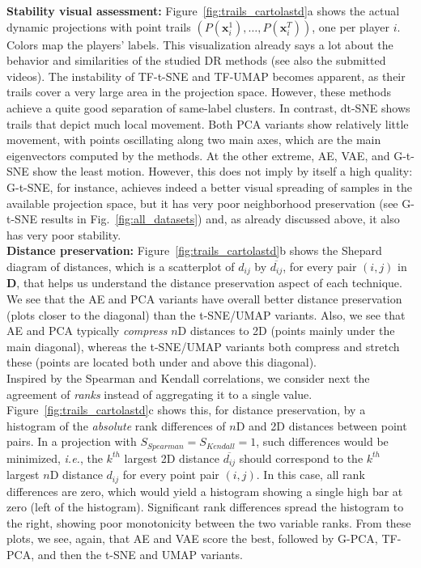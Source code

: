 \noindent\textbf{Stability visual assessment:} Figure~\ref{fig:trails_cartolastd}a shows the actual dynamic projections with point trails $(P(\mathbf{x}_i^1),\ldots, P(\mathbf{x}_i^T))$, one per player $i$. Colors map the players' labels. This visualization already says a lot about the behavior and similarities of the studied DR methods (see also the submitted videos). The instability of TF-t-SNE and TF-UMAP becomes apparent, as their trails cover a very large area in the projection space. However, these methods achieve a quite good separation of same-label clusters. In contrast, dt-SNE shows trails that depict much local movement. Both PCA variants show relatively little movement, with points oscillating along two main axes, which are the main eigenvectors computed by the methods. At the other extreme, AE, VAE, and G-t-SNE show the least motion. However, this does not imply by itself a high quality: G-t-SNE, for instance, achieves indeed a better visual spreading of samples in the available projection space, but it has very poor neighborhood preservation (see G-t-SNE results in Fig.~\ref{fig:all_datasets}) and, as already discussed above, it also has very poor stability.\\

\noindent\textbf{Distance preservation:} Figure~\ref{fig:trails_cartolastd}b shows the Shepard diagram of distances, which is a scatterplot of $d_{ij}$ by $\overline{d_{ij}}$, for every pair $(i,j)$ in $\mathbf{D}$, that helps us understand the distance preservation aspect of each technique. We see that the AE and PCA variants have overall better distance preservation (plots closer to the diagonal) than the t-SNE/UMAP variants. Also, we see that AE and PCA typically \emph{compress} $n$D distances to 2D (points mainly under the main diagonal), whereas the t-SNE/UMAP variants both compress and stretch these (points are located both under and above this diagonal).\\

Inspired by the Spearman and Kendall correlations, we consider next the agreement of \emph{ranks} instead of aggregating it to a single value. Figure~\ref{fig:trails_cartolastd}c shows this, for distance preservation, by a histogram of the \emph{absolute} rank differences of $n$D and 2D distances between point pairs. In a projection with $S_{Spearman} = S_{Kendall} = 1$, such differences would be minimized, \emph{i.e.}, the $k^{th}$ largest 2D distance $\overline{d_{ij}}$ should correspond to the $k^{th}$ largest $n$D distance $d_{ij}$ for every point pair $(i,j)$. In this case, all rank differences are zero, which would yield a histogram showing a single high bar at zero (left of the histogram). Significant rank differences spread the histogram to the right, showing poor monotonicity between the two variable ranks. From these plots, we see, again, that AE and VAE score the best, followed by G-PCA, TF-PCA, and then the t-SNE and UMAP variants.\\

